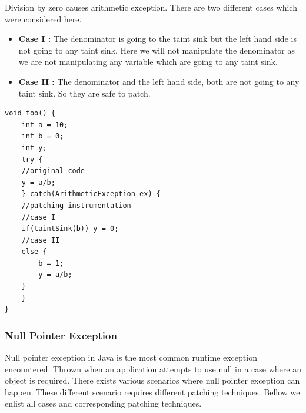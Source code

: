 Division by zero causes arithmetic exception. There are two different cases
which were considered here. 
\begin{itemize}
 \item \textbf{Case I :} The denominator is going to the taint sink but
the left hand side is not going to any taint sink. Here we will not
manipulate the denominator as we are not manipulating any variable which are
going to any taint sink.
 \item \textbf{Case II :} The denominator and the left hand side, both are not
going to any taint sink. So they are safe to patch.
\end{itemize}

\lstset{language=Java, caption=arithmetic exception : division-by-zero patching,
label=patchingexample2}

\begin{lstlisting}[countblanklines=false]
void foo() {
    int a = 10;
    int b = 0;
    int y;
    try {
	//original code
	y = a/b;
    } catch(ArithmeticException ex) {
	//patching instrumentation
	//case I
	if(taintSink(b)) y = 0;
	//case II
	else {
	    b = 1;
	    y = a/b;
	}
    }
}
\end{lstlisting}

\subsubsection{Null Pointer Exception}

Null pointer exception in Java is the most common runtime exception
encountered. 
Thrown when an application attempts to use null in a case where an object is
required. There exists various scenarios where null pointer exception can
happen. These different scenario requires different patching techniques. Bellow
we enlist all cases and corresponding patching techniques.



